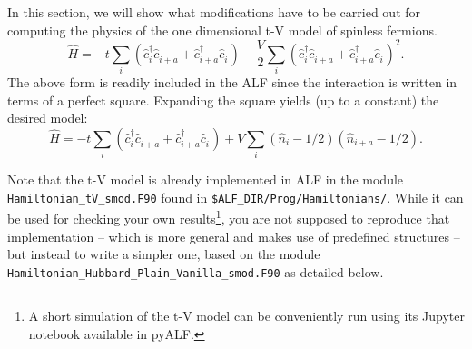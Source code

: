 \documentclass[10pt,modern]{scrartcl}
\numberwithin{exerciseitem}{exercise} %
\begin{document}
In this section, we will show what modifications have to be carried out for computing the physics of the  one dimensional t-V model of spinless fermions.  
\begin{equation}
\hat{H} =  -t \sum_{i} \left( \hat{c}^{\dagger}_{i}  \hat{c}^{\phantom\dagger}_{i+a}      + \hat{c}^{\dagger}_{i+a}  \hat{c}^{\phantom\dagger}_{i} \right) - \frac{V}{2} \sum_{i}  \left( \hat{c}^{\dagger}_{i}  \hat{c}^{\phantom\dagger}_{i+a}      + \hat{c}^{\dagger}_{i+a}  \hat{c}^{\phantom\dagger}_{i} \right)^2 .
\end{equation}
The above form is  readily included in the ALF since  the interaction is written in terms of a perfect square. Expanding the square  yields (up to a constant)  the desired model: 
\begin{equation}
\hat{H} =  -t \sum_{i} \left( \hat{c}^{\dagger}_{i}  \hat{c}^{\phantom\dagger}_{i+a}      + \hat{c}^{\dagger}_{i+a}  \hat{c}^{\phantom\dagger}_{i} \right)  + V  \sum_{i}  \left( \hat{n}_{i} - 1/2 \right)  \left( \hat{n}_{i+a} - 1/2 \right).
\end{equation}

Note that the t-V model is already implemented in ALF in the module \texttt{Hamiltonian\_tV\_smod.F90} found in  \texttt{\$ALF\_DIR/Prog/Hamiltonians/}. While it can be used for checking your own results\footnote{A short simulation of the t-V model can be conveniently run using its Jupyter notebook available in pyALF.}, you are not supposed to reproduce that implementation -- which is more general and makes use of predefined structures -- but instead to write a simpler one, based on the module \texttt{Hamiltonian\_Hubbard\_Plain\_Vanilla\_smod.F90} as detailed below.


\end{document}
